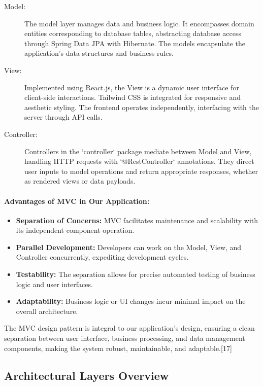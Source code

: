 \begin{description}
  \item[Model:] The model layer manages data and business logic. It encompasses domain entities corresponding to database tables, abstracting database access through Spring Data JPA with Hibernate. The models encapsulate the application's data structures and business rules.
  
  \item[View:] Implemented using React.js, the View is a dynamic user interface for client-side interactions. Tailwind CSS is integrated for responsive and aesthetic styling. The frontend operates independently, interfacing with the server through API calls.
  
  \item[Controller:] Controllers in the `controller` package mediate between Model and View, handling HTTP requests with `@RestController` annotations. They direct user inputs to model operations and return appropriate responses, whether as rendered views or data payloads.
\end{description}


\paragraph{Advantages of MVC in Our Application:}
\begin{itemize}
  \item \textbf{Separation of Concerns:} MVC facilitates maintenance and scalability with its independent component operation.
  \item \textbf{Parallel Development:} Developers can work on the Model, View, and Controller concurrently, expediting development cycles.
  \item \textbf{Testability:} The separation allows for precise automated testing of business logic and user interfaces.
  \item \textbf{Adaptability:} Business logic or UI changes incur minimal impact on the overall architecture.
\end{itemize}

The MVC design pattern is integral to our application's design, ensuring a clean separation between user interface, business processing, and data management components, making the system robust, maintainable, and adaptable.[17]


\subsection{Architectural Layers Overview}

